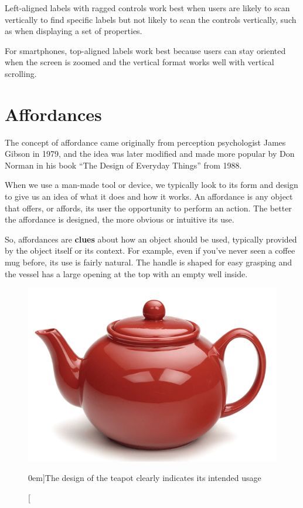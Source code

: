 Left-aligned labels with ragged controls work best when users are likely to scan vertically to find specific labels but not likely to scan the controls vertically, such as when displaying a set of properties. 

For smartphones, top-aligned labels work best because users can stay oriented when the screen is zoomed and the vertical format works well with vertical scrolling.


\section{Affordances} %
\label{sec:affordances}


The concept of affordance came originally from perception psychologist James Gibson in 1979, and the idea was later modified and made more popular by Don Norman in his book ``The Design of Everyday Things'' from 1988.

When we use a man-made tool or device, we typically look to its form and design to give us an idea of what it does and how it works. An affordance is any object that offers, or affords, its user the opportunity to perform an action. The better the affordance is designed, the more obvious or intuitive its use.

So, affordances are \textbf{clues} about how an object should be used, typically provided by the object itself or its context. For example, even if you've never seen a coffee mug before, its use is fairly natural. The handle is shaped for easy grasping and the vessel has a large opening at the top with an empty well inside.

\begin{figure}%
  \includegraphics[width=\textwidth]{../figures/teapot.png}
  \caption[][0em]{The design of the teapot clearly indicates its intended usage}
  \label{fig:teapot}
\end{figure}

